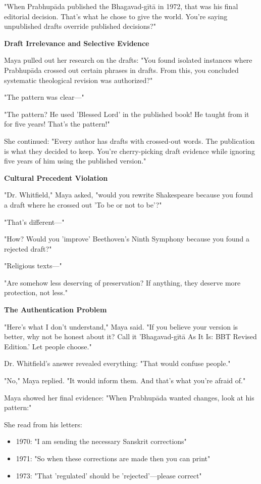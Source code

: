 \documentclass[12pt,twoside]{book}
\begin{document}
"When Prabhupāda published the Bhagavad-gītā in 1972, that was his final editorial decision. That's what he chose to give the world. You're saying unpublished drafts override published decisions?"

\textbf{\textbf{\textbf{Draft Irrelevance and Selective Evidence}}}

Maya pulled out her research on the drafts: "You found isolated instances where Prabhupāda crossed out certain phrases in drafts. From this, you concluded systematic theological revision was authorized?"

"The pattern was clear—"

"The pattern? He used 'Blessed Lord' in the published book! He taught from it for five years! That's the pattern!"

She continued: "Every author has drafts with crossed-out words. The publication is what they decided to keep. You're cherry-picking draft evidence while ignoring five years of him using the published version."

\textbf{\textbf{\textbf{Cultural Precedent Violation}}}

"Dr. Whitfield," Maya asked, "would you rewrite Shakespeare because you found a draft where he crossed out 'To be or not to be'?"

"That's different—"

"How? Would you 'improve' Beethoven's Ninth Symphony because you found a rejected draft?"

"Religious texts—"

"Are somehow less deserving of preservation? If anything, they deserve more protection, not less."

\textbf{\textbf{\textbf{The Authentication Problem}}}

"Here's what I don't understand," Maya said. "If you believe your version is better, why not be honest about it? Call it 'Bhagavad-gītā As It Is: BBT Revised Edition.' Let people choose."

Dr. Whitfield's answer revealed everything: "That would confuse people."

"No," Maya replied. "It would inform them. And that's what you're afraid of."

Maya showed her final evidence: "When Prabhupāda wanted changes, look at his pattern:"

She read from his letters:
\begin{itemize}
\item 1970: "I am sending the necessary Sanskrit corrections"
\item 1971: "So when these corrections are made then you can print"
\item 1973: "That 'regulated' should be 'rejected'—please correct"
\end{itemize}
\end{document}
